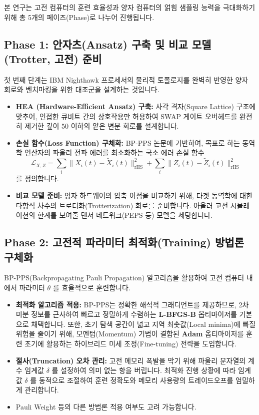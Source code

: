 \documentclass[11pt,a4paper]{article}
\begin{document}
본 연구는 고전 컴퓨터의 훈련 효율성과 양자 컴퓨터의 얽힘 샘플링 능력을 극대화하기 위해 총 5개의 페이즈(Phase)로 나누어 진행됩니다.

\subsection*{Phase 1: 안자츠(Ansatz) 구축 및 비교 모델(Trotter, 고전) 준비}
첫 번째 단계는 IBM Nighthawk 프로세서의 물리적 토폴로지를 완벽히 반영한 양자 회로와 벤치마킹을 위한 대조군을 설계하는 것입니다.

\begin{itemize}
    \item \textbf{HEA (Hardware-Efficient Ansatz) 구축:} 사각 격자(Square Lattice) 구조에 맞추어, 인접한 큐비트 간의 상호작용만 허용하여 SWAP 게이트 오버헤드를 완전히 제거한 깊이 $50$ 이하의 얕은 변분 회로를 설계합니다.
    \item \textbf{손실 함수(Loss Function) 구체화:} BP-PPS 논문에 기반하여, 목표로 하는 동역학 연산자의 파울리 전파 에러를 최소화하는 국소 에러 손실 함수
    \begin{equation*}
    \mathcal{L}_{X,Z} = \sum_{i} \|X_i(t) - \tilde{X}_i(t)\|_{\mathrm{rHS}}^2 + \sum_{i} \|Z_i(t) - \tilde{Z}_i(t)\|_{\mathrm{rHS}}^2
    \end{equation*}
    를 정의합니다.
    \item \textbf{비교 모델 준비:} 양자 하드웨어의 압축 이점을 비교하기 위해, 타겟 동역학에 대한 다항식 차수의 트로터화(Trotterization) 회로를 준비합니다. 아울러 고전 시뮬레이션의 한계를 보여줄 텐서 네트워크(PEPS 등) 모델을 세팅합니다.
\end{itemize}

\subsection*{Phase 2: 고전적 파라미터 최적화(Training) 방법론 구체화}
BP-PPS(Backpropagating Pauli Propagation) 알고리즘을 활용하여 고전 컴퓨터 내에서 파라미터 $\theta$ 를 효율적으로 훈련합니다.

\begin{itemize}
    \item \textbf{최적화 알고리즘 적용:} BP-PPS는 정확한 해석적 그래디언트를 제공하므로, 2차 미분 정보를 근사하여 빠르고 정밀하게 수렴하는 \textbf{L-BFGS-B} 옵티마이저를 기본으로 채택합니다. 또한, 초기 탐색 공간이 넓고 지역 최솟값(Local minima)에 빠질 위험을 줄이기 위해, 모멘텀(Momentum) 기법이 결합된 \textbf{Adam} 옵티마이저를 훈련 초기에 활용하는 하이브리드 미세 조정(Fine-tuning) 전략을 도입합니다.
    \item \textbf{절사(Truncation) 오차 관리:} 고전 메모리 폭발을 막기 위해 파울리 문자열의 계수 임계값 $\delta$ 를 설정하여 의미 없는 항을 버립니다. 최적화 진행 상황에 따라 임계값 $\delta$ 를 동적으로 조절하여 훈련 정확도와 메모리 사용량의 트레이드오프를 엄밀하게 관리합니다.
    \item Pauli Weight 등의 다른 방법론 적용 여부도 고려 가능합니다.
\end{itemize}
\end{document}
